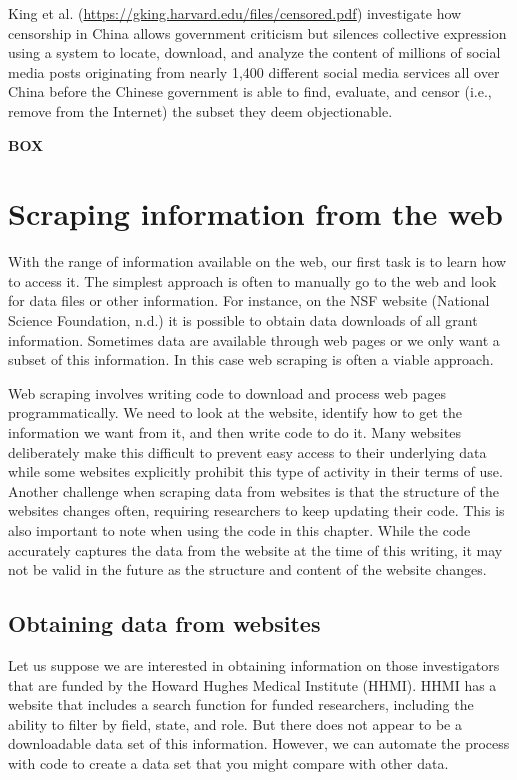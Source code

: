 \documentclass[]{krantz}
\begin{document}
King et al. (\url{https://gking.harvard.edu/files/censored.pdf})
investigate how censorship in China allows government criticism but
silences collective expression using a system to locate, download, and
analyze the content of millions of social media posts originating from
nearly 1,400 different social media services all over China before the
Chinese government is able to find, evaluate, and censor (i.e., remove
from the Internet) the subset they deem objectionable.

\textbf{BOX}

\section{Scraping information from the web}\label{sec:4-1}

With the range of information available on the web, our first task is to
learn how to access it. The simplest approach is often to manually go to
the web and look for data files or other information. For instance, on
the NSF website (National Science Foundation, n.d.) it is possible to
obtain data downloads of all grant information. Sometimes data are
available through web pages or we only want a subset of this
information. In this case web scraping is often a viable approach.

Web scraping involves writing code to download and process web pages
programmatically. We need to look at the website, identify how to get
the information we want from it, and then write code to do it. Many
websites deliberately make this difficult to prevent easy access to
their underlying data while some websites explicitly prohibit this type
of activity in their terms of use. Another challenge when scraping data
from websites is that the structure of the websites changes often,
requiring researchers to keep updating their code. This is also
important to note when using the code in this chapter. While the code
accurately captures the data from the website at the time of this
writing, it may not be valid in the future as the structure and content
of the website changes.

\subsection{Obtaining data from websites}\label{sec:4-1.1}

Let us suppose we are interested in obtaining information on those
investigators that are funded by the Howard Hughes Medical Institute
(HHMI). HHMI has a website that includes a search function for funded
researchers, including the ability to filter by field, state, and role.
But there does not appear to be a downloadable data set of this
information. However, we can automate the process with code to create a
data set that you might compare with other data.
\end{document}
